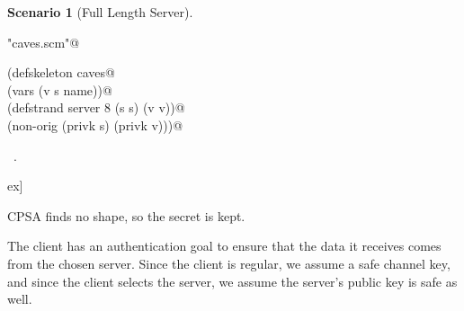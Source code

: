 \documentclass[titlepage,12pt]{article}
\theoremstyle{definition}
\newtheorem{scenario}{Scenario}
\begin{document}
\begin{scenario}[Full Length Server]\label{scene:full length server}
\begin{flushleft} \small
\begin{minipage}{\linewidth} \label{scrap30}
\verb@"caves.scm"@\nobreak\ {\footnotesize {} }
\vspace{-1ex}
\begin{list}{}{} \item
\mbox{}\verb@(defskeleton caves@\\
\mbox{}\verb@  (vars (v s name))@\\
\mbox{}\verb@  (defstrand server 8 (s s) (v v))@\\
\mbox{}\verb@  (non-orig (privk s) (privk v)))@{\NWsep}
\end{list}
\vspace{-1ex}
\footnotesize\addtolength{\baselineskip}{-1ex}
\begin{list}{}{\setlength{\itemsep}{-\parsep}\setlength{\itemindent}{-\leftmargin}}
\item \NWtxtFileDefBy\ .
\end{list}
\end{minipage}\4ex]
\end{flushleft}
\end{scenario}

CPSA finds no shape, so the secret is kept.

The client has an authentication goal to ensure that the
data it receives comes from the chosen server.
Since the client is regular, we assume a safe channel key,
and since the client selects the server, we assume the
server's public key is safe as well.
\end{document}
